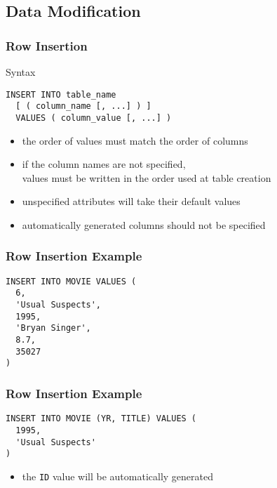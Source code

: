 \documentclass[dvipsnames]{beamer}
\theoremstyle{plain}
\begin{document}
\subsection{Data Modification}

\begin{frame}[fragile]
  \frametitle{Row Insertion}

  \begin{block}{Syntax}
    \begin{lstlisting}
INSERT INTO table_name
  [ ( column_name [, ...] ) ]
  VALUES ( column_value [, ...] )
    \end{lstlisting}
  \end{block}

  \pause
  \begin{itemize}
    \item the order of values must match the order of columns
    \item if the column names are not specified,\\
      values must be written in the order used at table creation
    \item unspecified attributes will take their default values
    \item automatically generated columns should not be specified
  \end{itemize}
\end{frame}

\begin{frame}[fragile]
  \frametitle{Row Insertion Example}

  \begin{example}
    \begin{lstlisting}
INSERT INTO MOVIE VALUES (
  6,
  'Usual Suspects',
  1995,
  'Bryan Singer',
  8.7,
  35027
)
    \end{lstlisting}
  \end{example}
\end{frame}

\begin{frame}[fragile]
  \frametitle{Row Insertion Example}

  \begin{example}
    \begin{lstlisting}
INSERT INTO MOVIE (YR, TITLE) VALUES (
  1995,
  'Usual Suspects'
)
    \end{lstlisting}

    \begin{itemize}
      \item the \texttt{ID} value will be automatically generated
    \end{itemize}
  \end{example}
\end{frame}
\end{document}
